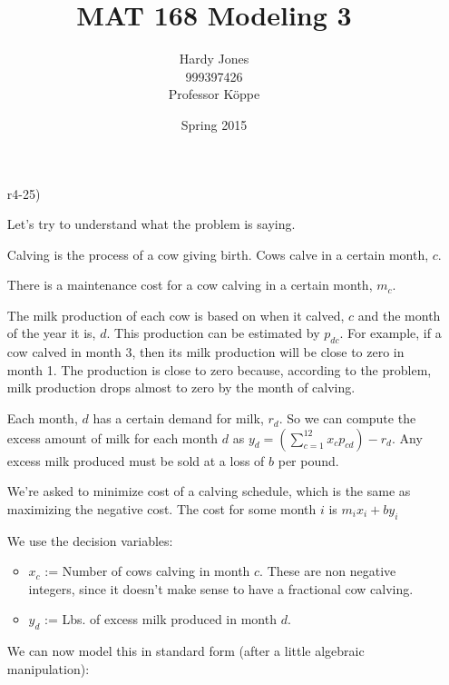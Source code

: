 \documentclass[12pt,letterpaper]{article}
\title{MAT 168 Modeling 3\vspace{-2ex}}
\author{Hardy Jones\\
        999397426\\
        Professor K\"{o}ppe\vspace{-2ex}}
\date{Spring 2015}
\begin{document}
  \maketitle

  \begin{enumerate}
    \item [r4-25)]

      Let's try to understand what the problem is saying.

      Calving is the process of a cow giving birth.
      Cows calve in a certain month, $c$.

      There is a maintenance cost for a cow calving in a certain month, $m_c$.

      The milk production of each cow is based on when it calved, $c$ and the month of the year it is, $d$.
      This production can be estimated by $p_{dc}$.
      For example, if a cow calved in month 3, then its milk production will be close to zero in month 1.
      The production is close to zero because, according to the problem,
      milk production drops almost to zero by the  month of calving.

      Each month, $d$ has a certain demand for milk, $r_d$.
      So we can compute the excess amount of milk for each month $d$ as
      $y_d = \left(\sum\limits_{c = 1}^{12} x_c p_{cd}\right) - r_d$.
      Any excess milk produced must be sold at a loss of $b$ per pound.

      We're asked to minimize cost of a calving schedule,
      which is the same as maximizing the negative cost.
      The cost for some month $i$ is $m_i x_i + b y_i$

      We use the decision variables:

      \begin{itemize}
        \item $x_c$ := Number of cows calving in month $c$. These are non negative integers, since it doesn't make sense to have a fractional cow calving.
        \item $y_d$ := Lbs. of excess milk produced in month $d$.
      \end{itemize}

      We can now model this in standard form (after a little algebraic manipulation):


\end{enumerate}
\end{document}
